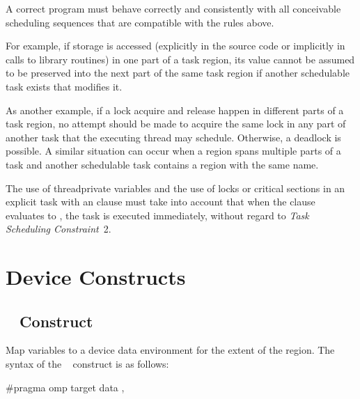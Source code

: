 A correct program must behave correctly and consistently with all conceivable 
scheduling sequences that are compatible with the rules above.

For example, if  storage is accessed (explicitly in the source code or 
implicitly in calls to library routines) in one part of a task region, its value cannot be 
assumed to be preserved into the next part of the same task region if another schedulable 
task exists that modifies it.

As another example, if a lock acquire and release happen in different parts of a task 
region, no attempt should be made to acquire the same lock in any part of another task 
that the executing thread may schedule. Otherwise, a deadlock is possible. A similar 
situation can occur when a  region spans multiple parts of a task and another 
schedulable task contains a  region with the same name.

The use of threadprivate variables and the use of locks or critical sections in an explicit 
task with an  clause must take into account that when the  clause evaluates to 
, the task is executed immediately, without regard to \emph{Task Scheduling Constraint}~2.
\noteend





\section{Device Constructs}
\label{sec:Device Constructs}

\subsection{~ Construct}
\label{subsec:target data Construct}
\summary
 Map variables to a device data environment for the extent of the region.
\syntax
\ccppspecificstart
The syntax of the ~ construct is as follows:

\begin{boxedcode}
\#pragma omp target data \plc{clause[ [ [},\plc{] clause] ... ] new-line}
\end{boxedcode}

